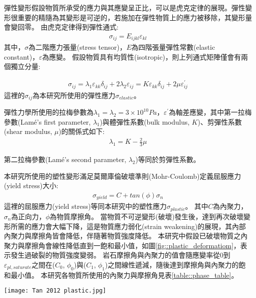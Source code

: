 彈性變形假設物質所承受的應力與其應變呈正比，可以是虎克定律的展現。彈性變形很重要的精隨為其變形是可逆的，若施加在彈性物質上的應力被移除，其變形量會變回零。
由虎克定律得到彈性通式:
\begin{align}
\sigma_{ij}=E_{ijkl} \varepsilon_{kl}
\end{align}
其中，$\sigma$為二階應力張量(stress tensor)，$E$為四階張量彈性常數(elastic constant)，$\varepsilon$為應變。
假設物質具有均質性(isotropic)，則上列通式矩陣僅會有兩個獨立分量:

\begin{align}
    \sigma_{ij}=\lambda_1 \varepsilon_{kk} \delta_{ij}+2 \lambda_2 \varepsilon_{ij}=K\varepsilon_{kk} \delta_{ij}+2 \mu \varepsilon_{ij}^{'} \label{eqn:elastic tensor}
\end{align}
這裡的$\sigma_{ij}$為本研究所使用的彈性應力$\sigma_{elastic}$。

彈性力學所使用的拉梅參數為$\lambda_1 = \lambda_2 = 3 \times 10^{10} Pa$，$\varepsilon^{'}$為軸差應變，其中第一拉梅參數(Lamé's first parameter, $\lambda_1$)與體彈性系數(bulk modulus, $K$)、剪彈性系數(shear modulus, $\mu$)的關係式如下:
\begin{align}
\lambda_1 = K - \frac{2}{3}\mu
\end{align}

第二拉梅參數(Lamé's second parameter, $\lambda_2$)等同於剪彈性系數。

本研究所使用的塑性變形滿足莫爾庫倫破壞準則(Mohr-Coulomb)定義屈服應力(yield stress)大小:
\begin{align}
    \sigma_{yield}=C+tan(\phi)\sigma_{n}\label{eqn:plastic deformation}
\end{align}
這裡的屈服應力(yield stress)等同本研究中的塑性應力$\sigma_{plastic}$。
其中$C$為內聚力，$\sigma_n$為正向力，$\phi$為物質摩擦角。
當物質不可逆變形(破壞)發生後，達到再次破壞變形所需的應力會大幅下降，這是物質應力弱化(strain weakening)的展現，其內部內聚力與摩擦角皆會降低，伴隨著物質強度降低。
本研究中假設已破壞物質之內聚力與摩擦角會線性降低直到一飽和最小值，如圖\ref{fig::plastic_deformatiom}，表示發生過破裂的物質強度變弱。
岩石摩擦角與內聚力的值會隨應變率從0到$\varepsilon_{pl,saturate}$之間在($C_0$, $\phi_0$)與($C_1$, $\phi_1$)之間線性遞減，隨後達到摩擦角與內聚力的飽和最小值。
本研究各物質所使用的內聚力與摩擦角見表\ref{table::phase_table}。
\begin{figure*}[ht!]
    \centering
    \texttt{[image: Tan 2012 plastic.jpg]}
    \caption[應力弱化示意圖，摘自\citet{Tan2012}]{應力弱化示意圖，摘自\citet{Tan2012}。在應變率為$0$時，岩石摩擦角與內聚力分別為$C_0$, $\phi_0$; 在應變率大於$\varepsilon_{pl,saturate}$時，岩石摩擦角與內聚力分別為$C_1$, $\phi_1$。摩擦角與內聚力的值會隨應變率變化在($C_0$, $\phi_0$)與($C_1$, $\phi_1$)之間線性遞減。
    }
    \label{fig::plastic_deformatiom}
\end{figure*}

